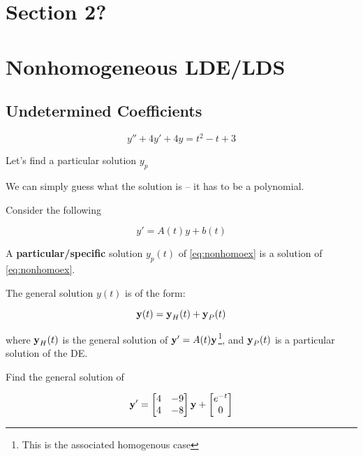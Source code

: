 	\section{Section 2?}

	\section{Nonhomogeneous LDE/LDS}

	\subsection{Undetermined Coefficients}

	\begin{example}
		\[y'' + 4y' + 4y = t^2 -t+3\]

		Let's find a particular solution $y_p$

		We can simply guess what the solution is -- it has to be a polynomial.
	\end{example}

	\begin{definition}
		Consider the following

		\begin{equation} \label{eq:nonhomoex}
			y' = A(t) y + b(t)
		\end{equation}

		A \textbf{particular/specific} solution $y_p(t)$ of \cref*{eq:nonhomoex} is a solution of \cref*{eq:nonhomoex}.
	\end{definition}

	\begin{theorem}
		The general solution $y(t)$ is of the form:

		\begin{equation} \label{eq:general-sol-form}
			\bm{\mathrm{y}}(t) = \bm{\mathrm{y}}_H(t) + \bm{\mathrm{y}}_P(t)
		\end{equation}

		where $\bm{\mathrm{y}}_H(t)$ is the general solution of $\bm{\mathrm{y}}' = A(t) \bm{\mathrm{y}}$\footnote{This is the associated homogenous case}, and $\bm{\mathrm{y}}_P(t)$ is a particular solution of the DE.
	\end{theorem}

	\begin{example}
		Find the general solution of

		\[\bm{\mathrm{y}}' = \begin{bmatrix}
			4&-9\\4&-8
		\end{bmatrix}\bm{\mathrm{y}} + \begin{bmatrix}
			e^{-t}\\0
		\end{bmatrix}\]
	\end{example}


